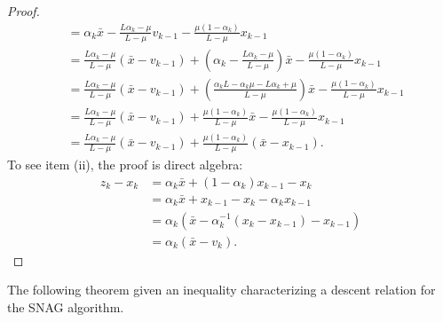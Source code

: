 \documentclass[12pt]{article}
\begin{document}
\begin{proof}
\begin{align*}
            &= \alpha_k \bar x 
            - \frac{L\alpha_k - \mu}{L - \mu} v_{k - 1} 
            - \frac{\mu(1 - \alpha_k)}{L - \mu} x_{k - 1}
            \\
            &= \frac{L\alpha_k - \mu}{L - \mu}(\bar x - v_{k - 1})
            + \left(
                \alpha_k - \frac{L\alpha_k - \mu}{L - \mu}
            \right)\bar x
            - \frac{\mu(1 - \alpha_k)}{L - \mu} x_{k - 1}
            \\
            &= \frac{L\alpha_k - \mu}{L - \mu}(\bar x - v_{k - 1})
            + \left(
                \frac{\alpha_kL - \alpha_k \mu - L\alpha_k + \mu}{L - \mu}
            \right)\bar x
            - \frac{\mu(1 - \alpha_k)}{L - \mu} x_{k - 1}
            \\
            &= \frac{L\alpha_k - \mu}{L - \mu}(\bar x - v_{k - 1})
            + \frac{\mu(1 - \alpha_k)}{L - \mu}\bar x
            - \frac{\mu(1 - \alpha_k)}{L - \mu} x_{k - 1}
            \\
            &= \frac{L\alpha_k - \mu}{L - \mu}(\bar x - v_{k - 1})
            + \frac{\mu(1 - \alpha_k)}{L - \mu}(\bar x - x_{k - 1}).
        \end{align*}
        To see item (ii), the proof is direct algebra: 
        \begin{align*}
            z_k - x_k &= \alpha_k \bar x + (1 - \alpha_k)x_{k - 1} - x_k
            \\
            &= \alpha_k \bar x + x_{k - 1} - x_k - \alpha_k x_{k - 1}
            \\
            &= \alpha_k(\bar x - \alpha_k^{-1}(x_k - x_{k - 1}) - x_{k - 1})
            \\
            &= \alpha_k (\bar x - v_k).
        \end{align*}
    \end{proof}
    The following theorem given an inequality characterizing a descent relation for the SNAG algorithm. 
    \begin{theorem}\label{thm:snag-descent}
        
    \end{theorem}
\end{document}
